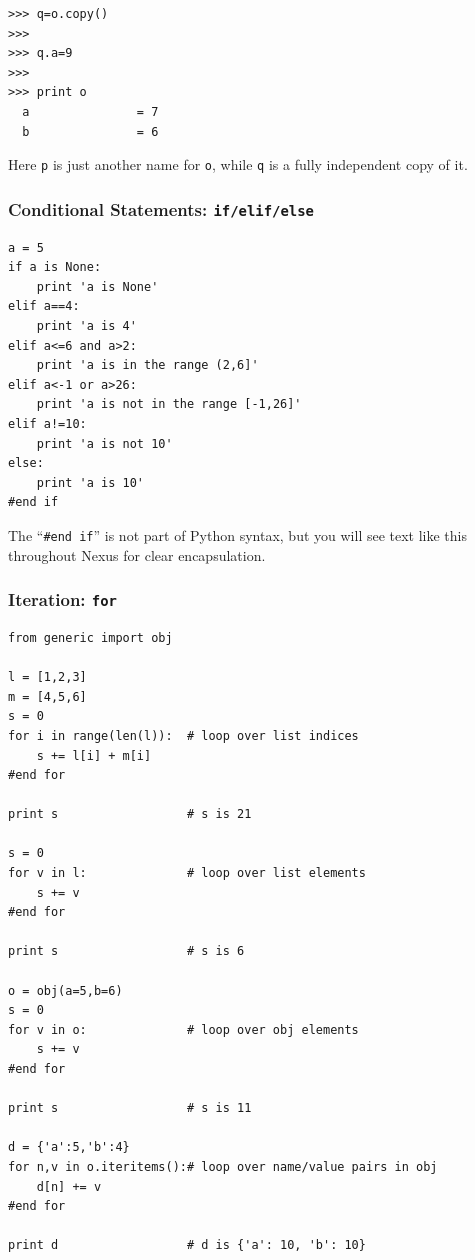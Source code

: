 {\begin{shaded}
\begin{verbatim}
>>> q=o.copy()
>>> 
>>> q.a=9
>>> 
>>> print o
  a               = 7
  b               = 6
\end{verbatim}
\end{shaded}
\noindent
Here \texttt{p} is just another name for \texttt{o}, while \texttt{q} is a fully independent copy of it.


\subsubsection{Conditional Statements: \texttt{if/elif/else}}
\begin{shaded}
\begin{verbatim}
a = 5
if a is None:
    print 'a is None'
elif a==4:
    print 'a is 4'
elif a<=6 and a>2:
    print 'a is in the range (2,6]'
elif a<-1 or a>26:
    print 'a is not in the range [-1,26]'
elif a!=10: 
    print 'a is not 10'
else:
    print 'a is 10'
#end if

\end{verbatim}
\end{shaded}
The ``\texttt{\#end if}'' is not part of Python syntax, but you will see text like this throughout Nexus for clear encapsulation.

\subsubsection{Iteration: \texttt{for}}
\begin{shaded}
\begin{verbatim}
from generic import obj

l = [1,2,3]              
m = [4,5,6]
s = 0
for i in range(len(l)):  # loop over list indices
    s += l[i] + m[i]
#end for

print s                  # s is 21

s = 0                    
for v in l:              # loop over list elements
    s += v
#end for

print s                  # s is 6

o = obj(a=5,b=6)
s = 0
for v in o:              # loop over obj elements
    s += v
#end for

print s                  # s is 11

d = {'a':5,'b':4}
for n,v in o.iteritems():# loop over name/value pairs in obj
    d[n] += v
#end for

print d                  # d is {'a': 10, 'b': 10}

\end{verbatim}
\end{shaded}


}
